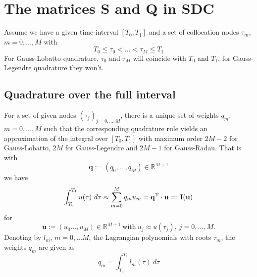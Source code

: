 \documentclass[11pt]{article}
\newcommand{\Tt}[1]{\mathbf{#1}}
\begin{document}
%
\section{The matrices $\Tt{S}$ and $\Tt{Q}$ in SDC}
Assume we have a given time-interval $[T_0, T_1]$ and a set of collocation nodes $\tau_m$, $m=0, \ldots, M$ with
\begin{equation}
	T_0 \leq \tau_0 < \ldots < \tau_M \leq T_1
\end{equation}
For Gauss-Lobatto quadrature, $\tau_0$ and $\tau_M$ will coincide with $T_0$ and $T_1$, for Gauss-Legendre quadrature they won't.

\subsection{Quadrature over the full interval}
For a set of given nodes $(\tau_j)_{j=0,\ldots,M}$, there is a unique set of weights $q_m$, $m=0,\ldots,M$ such that the corresponding quadrature rule yields an approximation
of the integral over $[T_0, T_1]$ with maximum order $2M-2$ for Gauss-Lobatto, $2M$ for Gauss-Legendre and $2M-1$ for Gauss-Radau. That is with
\begin{equation}
	\Tt{q} := \left( q_0, \ldots, q_M \right) \in \mathbb{R}^{M+1}
\end{equation}
we have
\begin{equation}
	\label{eq:def_I}
	\int_{T_0}^{T_1} u(\tau) \ d\tau \approx \sum_{m=0}^{M} q_{m} u_{m} = \Tt{q}^{\rm T} \cdot \Tt{u} =: \Tt{I}(\Tt{u})
\end{equation}
for
\begin{equation}
	\Tt{u} := \left( u_0 \ldots, u_M \right) \in \mathbb{R}^{M+1} \ \text{with} \ u_j \approx u(\tau_j), \ j=0,\ldots,M.
\end{equation}
Denoting by $l_m$, $m=0, \ldots M$,  the Lagrangian polynomials with roots $\tau_m$, the weights $q_m$ are given as
\begin{equation}
	q_m = \int_{T_0}^{T_1} l_m(\tau) \ d\tau
\end{equation}
\end{document}
